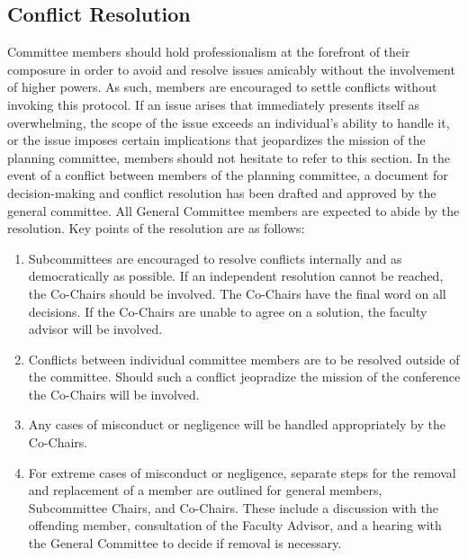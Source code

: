 \subsection{Conflict Resolution}

Committee members should hold professionalism at the forefront of their composure in order to avoid and resolve issues amicably without the involvement of higher powers. As such, members are encouraged to settle conflicts without invoking this protocol. If an issue arises that immediately presents itself as overwhelming, the scope of the issue exceeds an individual’s ability to handle it, or the issue imposes certain implications that jeopardizes the mission of the planning committee, members should not hesitate to refer to this section. In the event of a conflict between members of the planning committee, a document for decision-making and
conflict resolution has been drafted and approved by the general committee. All General Committee members
are expected to abide by the resolution. Key points of the resolution are as follows:
\begin{enumerate}
	\item Subcommittees are encouraged to resolve conflicts internally and as democratically as possible. If an independent resolution cannot be reached, the Co-Chairs should be involved. The Co-Chairs have the final word on all decisions. If the Co-Chairs are unable to agree on a solution, the faculty advisor will be involved.
	\item Conflicts between individual committee members are to be resolved outside of the committee. Should such a conflict jeopradize the mission of the conference the Co-Chairs will be involved. 
	\item Any cases of misconduct or negligence will be handled appropriately by the Co-Chairs.
	\item For extreme cases of misconduct or negligence, separate steps for the removal and replacement of a
	member are outlined for general members, Subcommittee Chairs, and Co-Chairs. These include
	a discussion with the offending member, consultation of the Faculty Advisor, and a hearing with the
	General Committee to decide if removal is necessary.
\end{enumerate}

